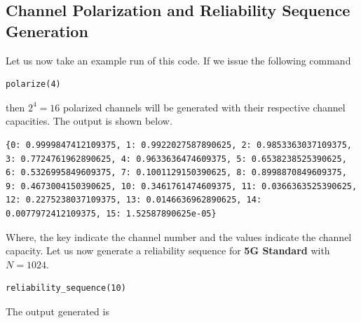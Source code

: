 \documentclass{report}
\begin{document}
\subsection*{Channel Polarization and Reliability Sequence Generation}

Let us now take an example run of this code. If we issue the following command 
\begin{lstlisting}
polarize(4) 
\end{lstlisting}
then $2^{4} = 16$ polarized channels will be generated with their respective channel capacities. The output is shown below.
\begin{lstlisting}
{0: 0.9999847412109375, 1: 0.9922027587890625, 2: 0.9853363037109375, 3: 0.7724761962890625, 4: 0.9633636474609375, 5: 0.6538238525390625, 6: 0.5326995849609375, 7: 0.1001129150390625, 8: 0.8998870849609375, 9: 0.4673004150390625, 10: 0.3461761474609375, 11: 0.0366363525390625, 12: 0.2275238037109375, 13: 0.0146636962890625, 14: 0.0077972412109375, 15: 1.52587890625e-05}
\end{lstlisting}
Where, the key indicate the channel number and the values indicate the channel capacity. Let us now generate a reliability sequence for \textbf{5G Standard} with $N=1024$.
\begin{lstlisting}
reliability_sequence(10)
\end{lstlisting}
The output generated is 
\end{document}

